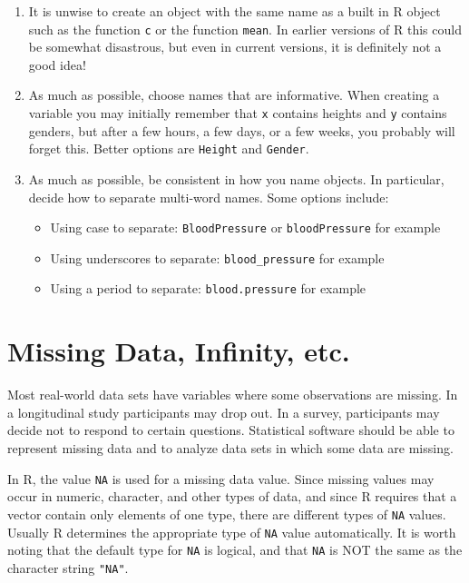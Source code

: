 \documentclass[
]{krantz}
\providecommand{\tightlist}{%
  \setlength{\itemsep}{0pt}\setlength{\parskip}{0pt}}
\begin{document}
\begin{enumerate}
\def\labelenumi{\arabic{enumi}.}
\setcounter{enumi}{1}
\tightlist
\item
  It is unwise to create an object with the same name as a built in R object such as the function \texttt{c} or the function \texttt{mean}. In earlier versions of R this could be somewhat disastrous, but even in current versions, it is definitely not a good idea!
\item
  As much as possible, choose names that are informative. When creating a variable you may initially remember that \texttt{x} contains heights and \texttt{y} contains genders, but after a few hours, a few days, or a few weeks, you probably will forget this. Better options are \texttt{Height} and \texttt{Gender}.
\item
  As much as possible, be consistent in how you name objects. In particular, decide how to separate multi-word names. Some options include:

  \begin{itemize}
  \tightlist
  \item
    Using case to separate: \texttt{BloodPressure} or \texttt{bloodPressure} for example
  \item
    Using underscores to separate: \texttt{blood\_pressure} for example
  \item
    Using a period to separate: \texttt{blood.pressure} for example
  \end{itemize}
\end{enumerate}

\hypertarget{missing-data-infinity-etc.}{%
\section{Missing Data, Infinity, etc.}\label{missing-data-infinity-etc.}}

Most real-world data sets have variables where some observations are missing. In a longitudinal study participants may drop out. In a survey, participants may decide not to respond to certain questions. Statistical software should be able to represent missing data and to analyze data sets in which some data are missing.

In R, the value \texttt{NA} is used for a missing data value. Since missing values may occur in numeric, character, and other types of data, and since R requires that a vector contain only elements of one type, there are different types of \texttt{NA} values. Usually R determines the appropriate type of \texttt{NA} value automatically. It is worth noting that the default type for \texttt{NA} is logical, and that \texttt{NA} is NOT the same as the character string \texttt{"NA"}.
\end{document}
